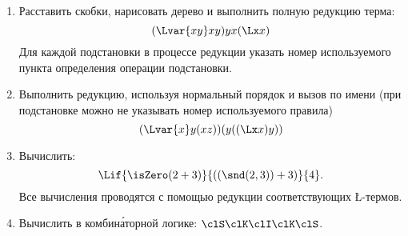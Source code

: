 \begin{enumerate}
    \itemsep=\myitemsep
    \item Расставить скобки, нарисовать дерево и выполнить полную редукцию
    терма:
    \[
        (\Lvar{xy} x y) yx (\Lx x)
    \] 
    Для каждой подстановки в процессе редукции указать номер используемого
    пункта определения операции подстановки.
    \item Выполнить редукцию, используя нормальный порядок и вызов по имени
    (при подстановке можно не указывать номер используемого правила)
    \[
        (\Lvar{x} y (xz)) (y ((\Lx x) y)) 
    \]
    \item Вычислить:
    $$\Lif {\isZero (2 + 3)} {((\snd (2, 3)) + 3)} {4}.$$
    Все вычисления проводятся с помощью редукции соответствующих \L-термов.
    \item Вычислить в комбин\'{а}торной логике:
    $\clS\clK\clI\clK\clS$.
\end{enumerate}